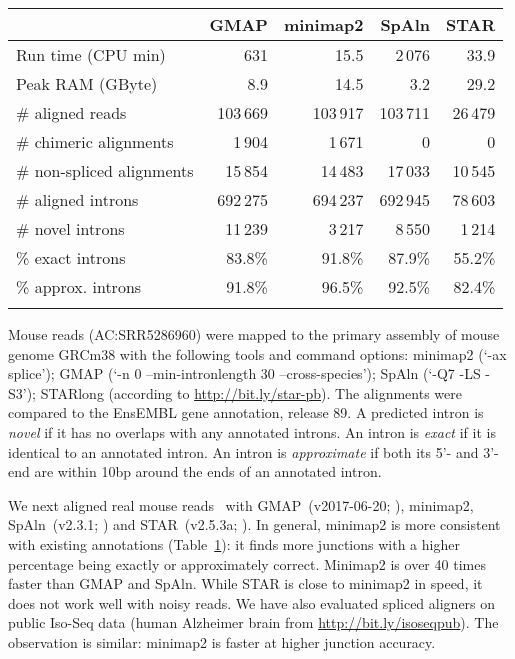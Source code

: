 \documentclass{bioinfo}
\begin{document}
\begin{table}[!tb]
{\footnotesize\label{tab:intron}
\begin{tabular}{p{3.1cm}rrrr}
\toprule
& GMAP & minimap2 & SpAln & STAR\\
\midrule
Run time (CPU min) & 631 & 15.5 & 2\,076 & 33.9 \\
Peak RAM (GByte) & 8.9 & 14.5 & 3.2 & 29.2\vspace{1em}\\
\# aligned reads & 103\,669 & 103\,917 & 103\,711 & 26\,479\\
\# chimeric alignments & 1\,904 & 1\,671 & 0 & 0\\
\# non-spliced alignments & 15\,854 & 14\,483 & 17\,033 & 10\,545\vspace{1em}\\
\# aligned introns & 692\,275 & 694\,237 & 692\,945 & 78\,603 \\
\# novel introns & 11\,239 & 3\,217 & 8\,550 & 1\,214 \\
\% exact introns & 83.8\% & 91.8\% & 87.9\% & 55.2\% \\
\% approx. introns & 91.8\% & 96.5\% & 92.5\% & 82.4\% \\
\botrule
\end{tabular}
}{Mouse reads (AC:SRR5286960) were mapped to the primary assembly of mouse
genome GRCm38 with the following tools and command options: minimap2 (`-ax
splice'); GMAP (`-n 0 --min-intronlength 30 --cross-species'); SpAln (`-Q7 -LS
-S3'); STARlong (according to
\href{http://bit.ly/star-pb}{http://bit.ly/star-pb}). The alignments were
compared to the EnsEMBL gene annotation, release 89. A predicted intron
is \emph{novel} if it has no overlaps with any annotated introns. An intron
is \emph{exact} if it is identical to an annotated intron. An intron is
\emph{approximate} if both its 5'- and 3'-end are within 10bp around the ends
of an annotated intron.}
\end{table}

We next aligned real mouse reads~\citep{Byrne:2017aa} with GMAP~(v2017-06-20;
\citealp{Wu:2005vn}), minimap2, SpAln~(v2.3.1; \citealp{Iwata:2012aa}) and
STAR~(v2.5.3a; \citealp{Dobin:2013kx}). In general, minimap2 is more
consistent with existing annotations (Table~\ref{tab:intron}): it finds
more junctions with a higher percentage being exactly or approximately correct.
Minimap2 is over 40 times faster than GMAP and SpAln. While STAR is close to
minimap2 in speed, it does not work well with noisy reads.  We have also
evaluated spliced aligners on public Iso-Seq data (human Alzheimer brain
from \href{http://bit.ly/isoseqpub}{http://bit.ly/isoseqpub}). The observation
is similar: minimap2 is faster at higher junction accuracy.
\end{document}
